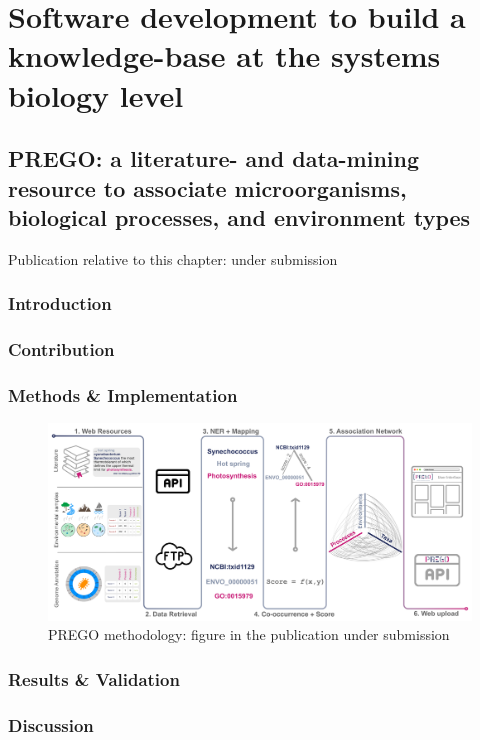 % 
% 


\chapter{Software development to build a knowledge-base at the systems biology level}
\label{cha:prego}



\section{PREGO: a literature- and data-mining resource to associate microorganisms, biological processes, and environment types}

Publication relative to this chapter: under submission

\subsection{Introduction}


\subsection{Contribution}

\subsection{Methods \& Implementation}



   \begin{figure}[!htbp]
      \centering
      \includegraphics[width=0.98\columnwidth]{figures/prego_analysis_horizontal.png}
      \caption{PREGO methodology: figure in the publication under submission}
   \end{figure}



\subsection{Results \& Validation}

\subsection{Discussion}


